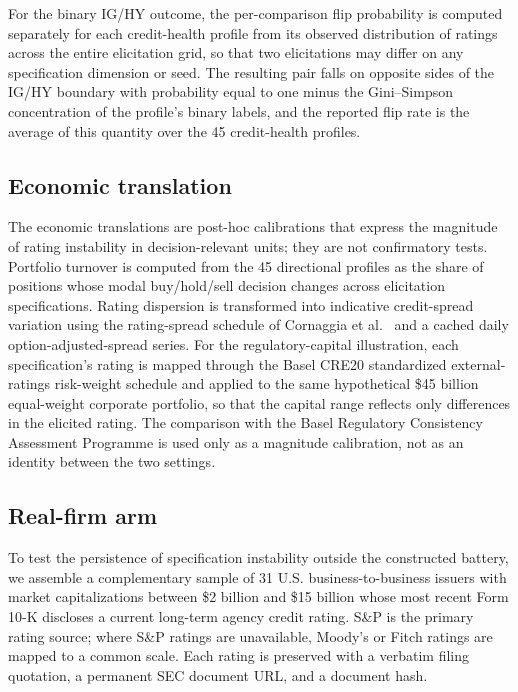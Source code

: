 \documentclass[pdflatex,sn-nature,lineno]{sn-jnl}
\theoremstyle{thmstyleone}
\begin{document}
For the binary IG/HY outcome, the per-comparison flip probability is computed separately for each
credit-health profile from its observed distribution of ratings across the entire elicitation grid, so
that two elicitations may differ on any specification dimension or seed. The resulting pair falls on
opposite sides of the IG/HY boundary with probability equal to one minus the Gini--Simpson concentration
of the profile's binary labels, and the reported flip rate is the average of this quantity over the 45
credit-health profiles.

\subsection{Economic translation}
The economic translations are post-hoc calibrations that express the magnitude of rating instability in
decision-relevant units; they are not confirmatory tests. Portfolio turnover is computed from the 45
directional profiles as the share of positions whose modal buy/hold/sell decision changes across
elicitation specifications. Rating dispersion is transformed into indicative credit-spread variation
using the rating-spread schedule of Cornaggia et al.\ \cite{cornaggia2018} and a cached daily
option-adjusted-spread series. For the regulatory-capital illustration, each specification's rating is
mapped through the Basel CRE20 standardized external-ratings risk-weight schedule \cite{bcbs2019cre20} and
applied to the same hypothetical \$45 billion equal-weight corporate portfolio, so that the capital range
reflects only differences in the elicited rating. The comparison with the Basel Regulatory Consistency
Assessment Programme \cite{bcbs2013rcap} is used only as a magnitude calibration, not as an identity
between the two settings.

\subsection{Real-firm arm}
To test the persistence of specification instability outside the constructed battery, we assemble a
complementary sample of 31 U.S. business-to-business issuers with market capitalizations between \$2
billion and \$15 billion whose most recent Form 10-K discloses a current long-term agency credit rating.
S\&P is the primary rating source; where S\&P ratings are unavailable, Moody's or Fitch ratings are
mapped to a common scale. Each rating is preserved with a verbatim filing quotation, a permanent SEC
document URL, and a document hash.
\end{document}
